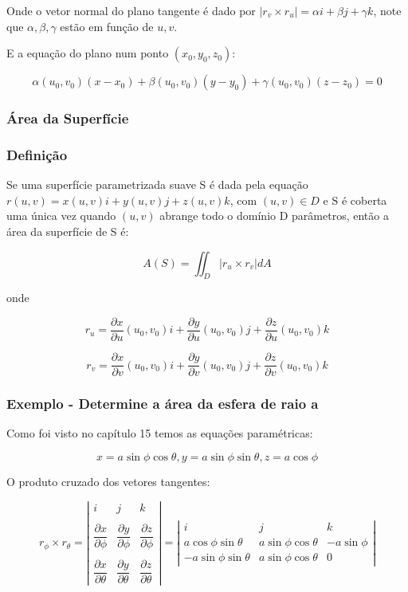 \documentclass[12pt]{article}
\begin{document}
Onde o vetor normal do plano tangente é dado por $|r_v \times r_u| = \alpha i + \beta j + \gamma k$, note que $\alpha, \beta, \gamma$ estão em função de $u, v$.

E a equação do plano num ponto $(x_0, y_0, z_0)$:

$$\alpha(u_0, v_0)(x - x_0) + \beta(u_0, v_0)(y - y_0) + \gamma(u_0, v_0)(z - z_0) = 0$$

\subsubsection*{Área da Superfície}
\subsubsection*{Definição}
Se uma superfície parametrizada suave S é dada pela equação $r(u, v) = x(u, v)i + y(u, v)j + z(u, v)k$, com $(u, v) \in D$ e S é coberta uma única vez quando $(u, v)$ abrange todo o domínio D parâmetros, então a área da superfície de S é:

$$A(S) = \iint_D |r_u \times r_v| dA$$

onde 

$$r_u = \dfrac{\partial x}{\partial u}(u_0, v_0)i + \dfrac{\partial y}{\partial u}(u_0, v_0)j + \dfrac{\partial z}{\partial u}(u_0, v_0)k$$ 

$$r_v = \dfrac{\partial x}{\partial v}(u_0, v_0)i + \dfrac{\partial y}{\partial v}(u_0, v_0)j + \dfrac{\partial z}{\partial v}(u_0, v_0)k$$

\subsubsection*{Exemplo - Determine a área da esfera de raio a}

Como foi visto no capítulo 15 temos as equações paramétricas:

$$ x = a \sin{\phi} \cos{\theta}, y = a \sin{\phi} \sin{\theta}, z = a \cos{\phi}$$

O produto cruzado dos vetores tangentes:

$$r_\phi \times r_\theta = \left| \begin{array}{rcr}
i & j  & k \\\\
 \dfrac{\partial x}{\partial \phi} & \dfrac{\partial y}{\partial \phi} & \dfrac{\partial z}{\partial \phi}\\\\
 \dfrac{\partial x}{\partial \theta} & \dfrac{\partial y}{\partial \theta}  & \dfrac{\partial z}{\partial \theta}
\end{array} \right| = \left| \begin{array}{rcr}
i & j  & k \\ 
 a \cos{\phi} \sin{\theta} & a \sin{\phi} \cos{\theta} & -a \sin{\phi}\\
 -a \sin{\phi} \sin{\theta} & a \sin{\phi} \cos{\theta}  & 0
\end{array} \right|$$
\end{document}
